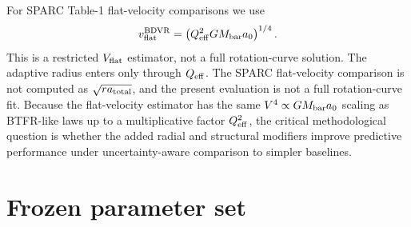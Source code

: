 \documentclass[aps,prd,preprint,nofootinbib,superscriptaddress]{revtex4-2}
\begin{document}
For SPARC Table-1 flat-velocity comparisons we use
\begin{equation}
v_{\rm flat}^{\rm BDVR} =
\left(Q_{\rm eff}^2 G M_{\mathrm{bar}} a_0\right)^{1/4} .
\end{equation}
This is a restricted $V_{\rm flat}$ estimator, not a full rotation-curve solution. The adaptive radius enters only through $Q_{\rm eff}$. The SPARC flat-velocity comparison is not computed as $\sqrt{r a_{\rm total}}$, and the present evaluation is not a full rotation-curve fit. Because the flat-velocity estimator has the same $V^4\propto G M_{\rm bar} a_0$ scaling as BTFR-like laws up to a multiplicative factor $Q_{\rm eff}^2$, the critical methodological question is whether the added radial and structural modifiers improve predictive performance under uncertainty-aware comparison to simpler baselines.

\section{Frozen parameter set}
\end{document}
